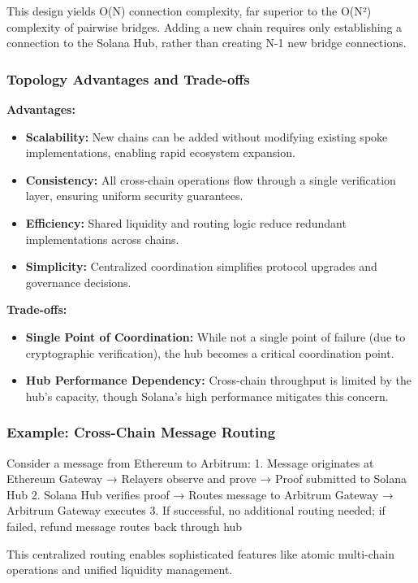 \documentclass[11pt,a4paper]{article}
\begin{document}
This design yields O(N) connection complexity, far superior to the O(N²) complexity of pairwise bridges. Adding a new chain requires only establishing a connection to the Solana Hub, rather than creating N-1 new bridge connections.

\subsubsection{Topology Advantages and Trade-offs}

\textbf{Advantages:}
\begin{itemize}
    \item \textbf{Scalability:} New chains can be added without modifying existing spoke implementations, enabling rapid ecosystem expansion.
    \item \textbf{Consistency:} All cross-chain operations flow through a single verification layer, ensuring uniform security guarantees.
    \item \textbf{Efficiency:} Shared liquidity and routing logic reduce redundant implementations across chains.
    \item \textbf{Simplicity:} Centralized coordination simplifies protocol upgrades and governance decisions.
\end{itemize}

\textbf{Trade-offs:}
\begin{itemize}
    \item \textbf{Single Point of Coordination:} While not a single point of failure (due to cryptographic verification), the hub becomes a critical coordination point.
    \item \textbf{Hub Performance Dependency:} Cross-chain throughput is limited by the hub's capacity, though Solana's high performance mitigates this concern.
\end{itemize}

\subsubsection{Example: Cross-Chain Message Routing}
Consider a message from Ethereum to Arbitrum:
1. Message originates at Ethereum Gateway → Relayers observe and prove → Proof submitted to Solana Hub
2. Solana Hub verifies proof → Routes message to Arbitrum Gateway → Arbitrum Gateway executes
3. If successful, no additional routing needed; if failed, refund message routes back through hub

This centralized routing enables sophisticated features like atomic multi-chain operations and unified liquidity management.
\end{document}
